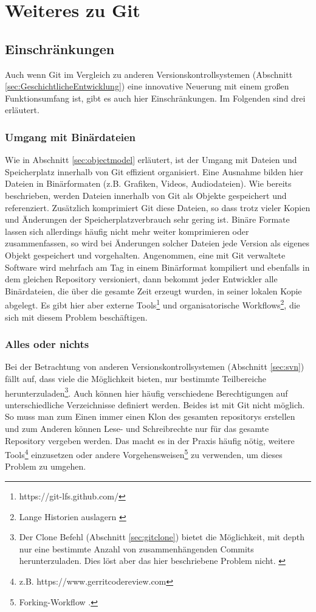 \chapter{Weiteres zu Git}\label{cha:somethingmore}
\section{Einschränkungen}\label{sec:problems}
Auch wenn Git im Vergleich zu anderen Versionskontrollsystemen (Abschnitt
\ref{sec:GeschichtlicheEntwicklung}) eine innovative Neuerung mit einem großen
Funktionsumfang ist, gibt es auch hier Einschränkungen. Im Folgenden sind drei
erläutert.

\subsection{Umgang mit Binärdateien}\label{sec:binaries}
Wie in Abschnitt \ref{sec:objectmodel} erläutert, ist der Umgang mit Dateien
und Speicherplatz innerhalb von Git effizient organisiert. Eine Ausnahme bilden
hier Dateien in Binärformaten (z.B.  Grafiken, Videos, Audiodateien). Wie
bereits beschrieben, werden Dateien innerhalb von Git als Objekte gespeichert
und referenziert.  Zusätzlich komprimiert Git diese Dateien, so dass trotz
vieler Kopien und Änderungen der Speicherplatzverbrauch sehr gering ist. Binäre
Formate lassen sich allerdings häufig nicht mehr weiter komprimieren oder
zusammenfassen, so wird bei Änderungen solcher Dateien jede Version als eigenes
Objekt gespeichert und vorgehalten. Angenommen, eine mit Git verwaltete
Software wird mehrfach am Tag in einem Binärformat kompiliert und ebenfalls in
dem gleichen Repository versioniert, dann bekommt jeder Entwickler alle
Binärdateien, die über die gesamte Zeit erzeugt wurden, in seiner lokalen Kopie
abgelegt. Es gibt hier aber externe
Tools\footnote{https://git-lfs.github.com/} und organisatorische
Workflows\footnote{Lange Historien auslagern \cite[S.~235-244]{gitwf}}, die
sich mit diesem Problem beschäftigen.  \cite[S.~300]{gitwf}

\subsection{Alles oder nichts}
Bei der Betrachtung von anderen Versionskontrollsystemen (Abschnitt
\ref{sec:svn}) fällt auf, dass viele die Möglichkeit bieten, nur bestimmte
Teilbereiche herunterzuladen\footnote{Der Clone Befehl (Abschnitt
\ref{sec:gitclone}) bietet die Möglichkeit, mit \-{}\-{}depth nur eine
bestimmte Anzahl von zusammenhängenden Commits herunterzuladen. Dies löst aber das
hier beschriebene Problem nicht. \cite[S.~244]{gitwf}}. Auch können hier
häufig verschiedene Berechtigungen auf unterschiedliche Verzeichnisse definiert
werden.  Beides ist mit Git nicht möglich. So muss man zum Einen immer einen
Klon des gesamten \glspl{repository} erstellen und zum Anderen können Lese- und
Schreibrechte nur für das gesamte Repository vergeben werden. Das macht es in
der Praxis häufig nötig, weitere Tools\footnote{z.B.
https://www.gerritcodereview.com} einzusetzen oder andere
Vorgehensweisen\footnote{Forking-Workflow \cite[S.~163-173]{gitwf}.} zu
verwenden, um dieses Problem zu umgehen. \cite[300-302]{gitwf}

